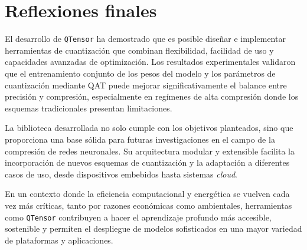 \section{Reflexiones finales}
El desarrollo de \texttt{QTensor} ha demostrado que es posible diseñar e implementar herramientas de cuantización que combinan flexibilidad, facilidad de uso y capacidades avanzadas de optimización. Los resultados experimentales validaron que el entrenamiento conjunto de los pesos del modelo y los parámetros de cuantización mediante QAT puede mejorar significativamente el balance entre precisión y compresión, especialmente en regímenes de alta compresión donde los esquemas tradicionales presentan limitaciones.

La biblioteca desarrollada no solo cumple con los objetivos planteados, sino que proporciona una base sólida para futuras investigaciones en el campo de la compresión de redes neuronales. Su arquitectura modular y extensible facilita la incorporación de nuevos esquemas de cuantización y la adaptación a diferentes casos de uso, desde dispositivos embebidos hasta sistemas \textit{cloud}.

En un contexto donde la eficiencia computacional y energética se vuelven cada vez más críticas, tanto por razones económicas como ambientales, herramientas como \texttt{QTensor} contribuyen a hacer el aprendizaje profundo más accesible, sostenible y permiten el despliegue de modelos sofisticados en una mayor variedad de plataformas y aplicaciones.




